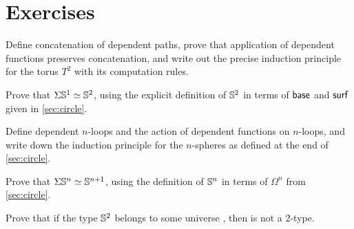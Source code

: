 \section*{Exercises}

\begin{ex}\label{ex:torus}
  Define concatenation of dependent paths, prove that application of dependent functions preserves concatenation, and write out the precise induction principle for the torus $T^2$ with its computation rules.
\end{ex}

\begin{ex}\label{ex:suspS1}
  Prove that $\Sigma \mathbb{S}^1 \simeq \mathbb{S}^2$, using the explicit definition of $\mathbb{S}^2$ in terms of $\mathsf{base}$ and $\mathsf{surf}$ given in \autoref{sec:circle}.
\end{ex}

\begin{ex}\label{ex:nspheres}
  Define dependent $n$-loops and the action of dependent functions on $n$-loops, and write down the induction principle for the $n$-spheres as defined at the end of \autoref{sec:circle}.
\end{ex}

\begin{ex}
  Prove that $\Sigma \mathbb{S}^n \simeq \mathbb{S}^{n+1}$, using the definition of $\mathbb{S}^n$ in terms of $\Omega^n$ from \autoref{sec:circle}.
\end{ex}

\begin{ex}
  Prove that if the type $\mathbb{S}^2$ belongs to some universe \type, then \type is not a 2-type.
\end{ex}

